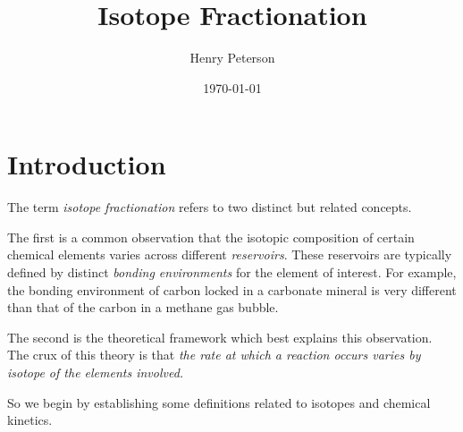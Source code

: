 \documentclass[12pt, twocolumn]{article}
\author{Henry Peterson}
\date{\today}
\title{Isotope Fractionation}
\begin{document}
\maketitle

\section*{Introduction}
The term \emph{isotope fractionation} refers to two distinct but related concepts. 

The first is a common observation that the isotopic composition of certain chemical elements varies across different \emph{reservoirs}. These reservoirs are typically defined by distinct \emph{bonding environments} for the element of interest. For example, the bonding environment of carbon locked in a carbonate mineral is very different than that of the carbon in a methane gas bubble.

The second is the theoretical framework which best explains this observation. The crux of this theory is that \emph{the rate at which a reaction occurs varies by isotope of the elements involved.}

So we begin by establishing some definitions related to isotopes and chemical kinetics.
\end{document}
